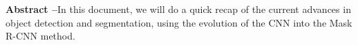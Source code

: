 
\textbf{Abstract --}In this document, we will do a quick recap of the current advances in object detection and segmentation, using the evolution of the CNN into the Mask R-CNN method. 
